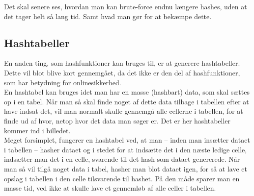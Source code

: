 Det skal senere ses, hvordan man kan brute-force endnu længere hashes, uden at det tager helt så lang tid.
Samt hvad man gør for at bekæmpe dette.

\subsection{Hashtabeller}
En anden ting, som hashfunktioner kan bruges til, er at generere hashtabeller.
Dette vil blot blive kort gennemgået, da det ikke er den del af hashfunktioner, som har betydning for onlinesikkerhed.\\
En hashtabel kan bruges idet man har en masse (hashbart) data, som skal sættes op i en tabel.
Når man så skal finde noget af dette data tilbage i tabellen efter at have indsat det, vil man normalt skulle gennemgå alle cellerne i tabellen, for at finde ud af hvor, netop hvor det data man søger er. Det er her hashtabeller kommer ind i billedet.\\
Meget forsimplet, fungerer en hashtabel ved, at man -- inden man insætter dataet i tabellen -- hasher dataet og i stedet for at indsætte det i den næste ledige celle, indsætter man det i en celle, svarende til det hash som dataet genererede.
Når man så vil tilgå noget data i tabel, hasher man blot dataet igen, for så at lave et opslag i tabellen i den celle tilsvarende til hashet. På den måde sparer man en masse tid, ved ikke at skulle lave et gennemløb af alle celler i tabellen.\cite{hashtables}
